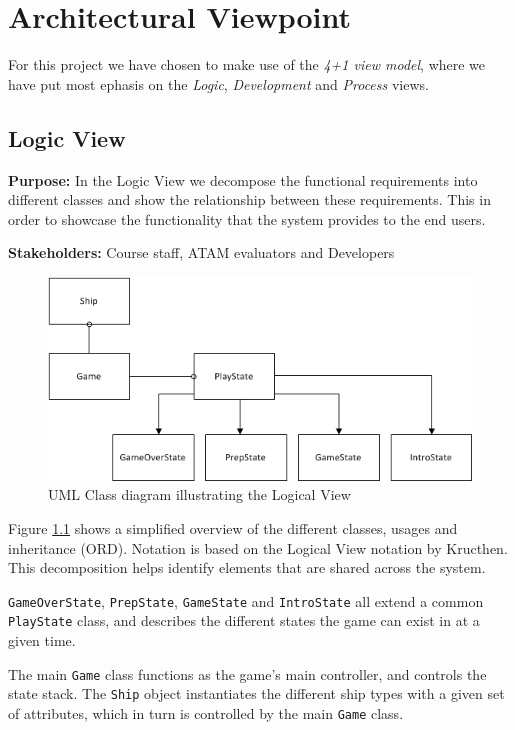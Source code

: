 \chapter{Architectural Viewpoint}
For this project we have chosen to make use of the \emph{4+1 view model}, where we have put most ephasis on the \emph{Logic}, \emph{Development} and \emph{Process} views.

    \section{Logic View}
    \textbf{Purpose:} In the Logic View we decompose the functional requirements into different classes and show the relationship between these requirements. This in order to showcase the functionality that the system provides to the end users.

    
    
    \noindent\textbf{Stakeholders:} Course staff, ATAM evaluators and Developers 
    
    
    \begin{figure}[h]
        \includegraphics[width=\textwidth]{LogicalView.png}
        \caption{UML Class diagram illustrating the Logical View}
        \label{fig:LogicalView}
    \end{figure}


    Figure \ref{fig:LogicalView} shows a simplified overview of the different classes, usages and inheritance (ORD). Notation is based on the Logical View notation by Kructhen\cite{kruchten}. This decomposition helps identify elements that are shared across the system.

    \texttt{GameOverState}, \texttt{PrepState}, \texttt{GameState} and \texttt{IntroState} all extend a common \texttt{PlayState} class, and describes the different states the game can exist in at a given time.

    The main \texttt{Game} class functions as the game's main controller, and controls the state stack. The \texttt{Ship} object instantiates the different ship types with a given set of attributes, which in turn is controlled by the main \texttt{Game} class.

